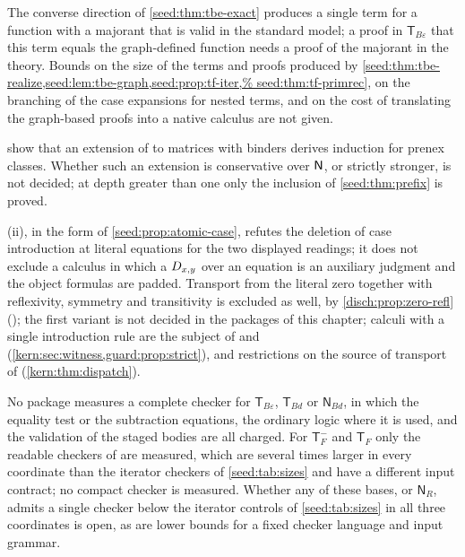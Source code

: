 \begin{question}
The converse direction of \cref{seed:thm:tbe-exact} produces a single term
for a function with a majorant that is valid in the standard model; a proof
in $\mathsf{T}_{B\varepsilon}$ that this term equals the graph-defined
function needs a proof of the majorant in the theory. Bounds on the size of
the terms and proofs produced by
\cref{seed:thm:tbe-realize,seed:lem:tbe-graph,seed:prop:tf-iter,%
seed:thm:tf-primrec}, on the branching of the case expansions for nested
terms, and on the cost of translating the graph-based proofs into a native
calculus are not given.
\end{question}

\begin{question}
 show that an extension of
 to matrices with binders derives induction for prenex
classes. Whether such an extension is conservative over $\mathsf{N}$, or strictly
stronger, is not decided; at depth greater than one only the inclusion of
\cref{seed:thm:prefix} is proved.
\end{question}

\begin{question}
(ii), in the form of
\cref{seed:prop:atomic-case}, refutes the deletion of case introduction at
literal equations for the two displayed readings; it does not exclude a
calculus in which a $D_{x,y}$ over an equation is an auxiliary judgment and
the object formulas are padded. Transport from the literal zero together
with reflexivity, symmetry and transitivity is excluded as well, by
\cref{disch:prop:zero-refl} (); the first variant
is not decided in the packages of this chapter; calculi with a
single introduction rule are the subject of  and
 (\cref{kern:sec:witness,guard:prop:strict}), and
restrictions on the source of transport of 
(\cref{kern:thm:dispatch}).
\end{question}

\begin{question}
No package measures a complete checker for $\mathsf{T}_{B\varepsilon}$,
$\mathsf{T}_{Bd}$ or $\mathsf{N}_{Bd}$, in which the
equality test or the subtraction equations, the ordinary logic where it is
used, and the validation of the staged bodies are all charged. For
$\mathsf{T}_F^{-}$ and $\mathsf{T}_F$ only the readable checkers of
 are measured, which are several times larger in
every coordinate than the iterator checkers of \cref{seed:tab:sizes} and
have a different input contract; no compact checker is measured. Whether any
of these bases, or $\mathsf{N}_R$, admits a single checker below the
iterator controls of \cref{seed:tab:sizes} in all three coordinates is open,
as are lower bounds for a fixed checker language and input grammar.
\end{question}

